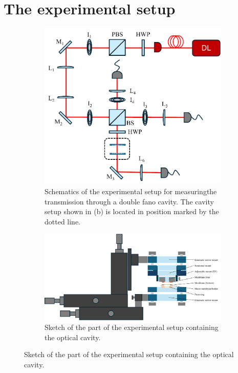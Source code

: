 \section{The experimental setup}

\begin{figure}
    \centering
    \begin{subfigure}[b]{0.4\textwidth}
        \includegraphics[width=\textwidth]{figures/setup_sketch.pdf}
        \caption{Schematics of the experimental setup for measuringthe transmission through a double fano cavity. The cavity setup shown in (b) is located in position marked by the dotted line.}
    \end{subfigure}
    \hfill
    \begin{subfigure}[b]{0.59\textwidth}
        \includegraphics[width=\textwidth]{figures/setup_skecth_zoomed.pdf}
        \caption{Sketch of the part of the experimental setup containing the optical cavity.}
    \end{subfigure}
\end{figure}

